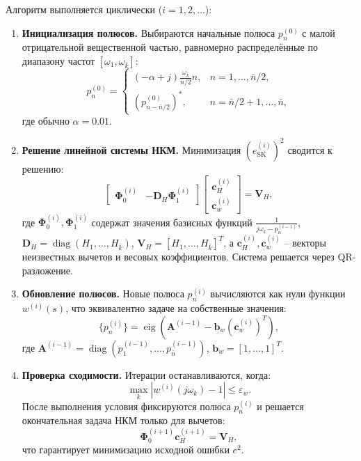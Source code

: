 Алгоритм выполняется циклически ($i=1,2,\dots$):
\begin{enumerate}
    \item \textbf{Инициализация полюсов.} Выбираются начальные полюса $p_n^{(0)}$ с малой отрицательной вещественной частью, равномерно распределённые по диапазону частот $[\omega_1, \omega_{\bar{k}}]$:
    \begin{equation}
        p_n^{(0)} = \begin{cases}
            (-\alpha + j) \frac{\omega_{\bar{k}}}{\bar{n}/2} n, & n=1,\dots,\bar{n}/2,\\
            (p_{n-\bar{n}/2}^{(0)})^*, & n=\bar{n}/2+1,\dots,\bar{n},
        \end{cases}
    \end{equation}
    где обычно $\alpha = 0.01$.
    
    \item \textbf{Решение линейной системы НКМ.} Минимизация $(e_{\text{SK}}^{(i)})^2$ сводится к решению:
    \begin{equation}
        \begin{bmatrix}
            \bm{\Phi}_0^{(i)} & -\mathbf{D}_H \bm{\Phi}_1^{(i)}
        \end{bmatrix}
        \begin{bmatrix}
            \mathbf{c}_H^{(i)} \\ \mathbf{c}_w^{(i)}
        \end{bmatrix}
        = \mathbf{V}_H,
    \end{equation}
    где $\bm{\Phi}_0^{(i)}, \bm{\Phi}_1^{(i)}$ содержат значения базисных функций $\frac{1}{j\omega_k - p_n^{(i-1)}}$, $\mathbf{D}_H = \operatorname{diag}(H_1,\dots,H_{\bar{k}})$, $\mathbf{V}_H = [H_1,\dots,H_{\bar{k}}]^T$, а $\mathbf{c}_H^{(i)}, \mathbf{c}_w^{(i)}$ -- векторы неизвестных вычетов и весовых коэффициентов. Система решается через QR-разложение.
    
    \item \textbf{Обновление полюсов.} Новые полюса $p_n^{(i)}$ вычисляются как нули функции $w^{(i)}(s)$, что эквивалентно задаче на собственные значения:
    \begin{equation}
        \{p_n^{(i)}\} = \operatorname{eig}\left( \mathbf{A}^{(i-1)} - \mathbf{b}_w (\mathbf{c}_w^{(i)})^T \right),
    \end{equation}
    где $\mathbf{A}^{(i-1)} = \operatorname{diag}(p_1^{(i-1)},\dots,p_{\bar{n}}^{(i-1)})$, $\mathbf{b}_w = [1,\dots,1]^T$.
    
    \item \textbf{Проверка сходимости.} Итерации останавливаются, когда:
    \begin{equation}
        \max_k \left| w^{(i)}(j\omega_k) - 1 \right| \le \varepsilon_w.
    \end{equation}
    После выполнения условия фиксируются полюса $p_n^{(i)}$ и решается окончательная задача НКМ только для вычетов:
    \begin{equation}
        \bm{\Phi}_0^{(i+1)} \mathbf{c}_H^{(i+1)} = \mathbf{V}_H,
    \end{equation}
    что гарантирует минимизацию исходной ошибки $e^2$.
\end{enumerate}

